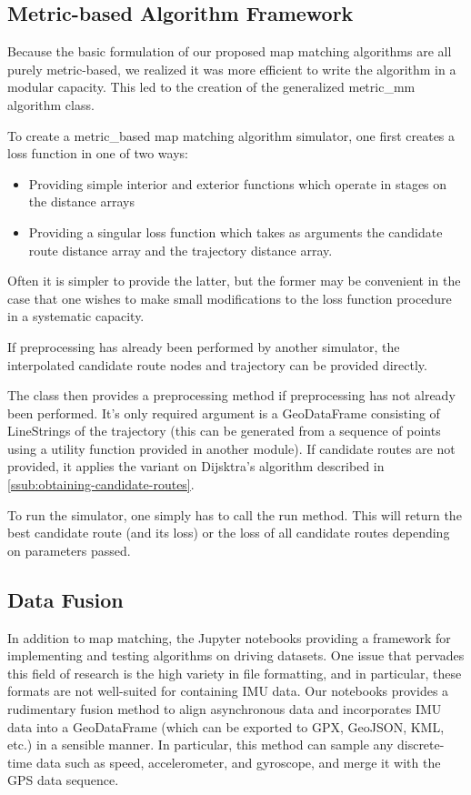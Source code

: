 \documentclass{article}
\numberwithin{equation}{section}
\theoremstyle{definition}
\begin{document}
\subsection{Metric-based Algorithm Framework}

Because the basic formulation of our proposed map matching algorithms are all purely metric-based, we realized it was more efficient to write the algorithm in a modular capacity. This led to the creation of the generalized metric\_mm algorithm class.

To create a metric\_based map matching algorithm simulator, one first creates a loss function in one of two ways:

\begin{itemize}
    \item Providing simple interior and exterior functions which operate in stages on the distance arrays
    \item Providing a singular loss function which takes as arguments the candidate route distance array and the trajectory distance array.
\end{itemize}

Often it is simpler to provide the latter, but the former may be convenient in the case that one wishes to make small modifications to the loss function procedure in a systematic capacity.

If preprocessing has already been performed by another simulator, the interpolated candidate route nodes and trajectory can be provided directly.

The class then provides a preprocessing method if preprocessing has not already been performed. It's only required argument is a GeoDataFrame consisting of LineStrings of the trajectory (this can be generated from a sequence of points using a utility function provided in another module). If candidate routes are not provided, it applies the variant on Dijsktra's algorithm described in \ref{ssub:obtaining-candidate-routes}.

To run the simulator, one simply has to call the run method. This will return the best candidate route (and its loss) or the loss of all candidate routes depending on parameters passed.

\subsection{Data Fusion}
In addition to map matching, the Jupyter notebooks providing a framework for implementing and testing algorithms on driving datasets. One issue that pervades this field of research is the high variety in file formatting, and in particular, these formats are not well-suited for containing IMU data. Our notebooks provides a rudimentary fusion method to align asynchronous data and incorporates IMU data into a GeoDataFrame (which can be exported to GPX, GeoJSON, KML, etc.) in a sensible manner. In particular, this method can sample any discrete-time data such as speed, accelerometer, and gyroscope, and merge it with the GPS data sequence.
\end{document}
